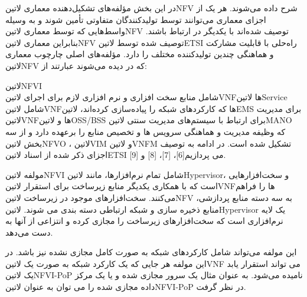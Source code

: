 
در این بخش مؤلفه‌های تشکیل‌دهنده معماری ‌لاتین{NFV} شرح داده می‌شوند.
هر یک از اجزای معماری می‌توانند توسط تولیدکنندگان متفاوتی تأمین شوند و به وسیله واسط‌هایی که توسط معماری ‌لاتین{NFV} توصیف شده‌اند
با یکدیگر در ارتباط باشند.
بنابراین معماری ‌لاتین{NFV} توصیف شده توسط ‌لاتین{ETSI} راه‌حلی با قابلیت مشارکت و هماهنگی چندین تولیدکننده مختلف را دارد.
مؤلفه‌های اصلی چارچوب معماری ‌لاتین{NFV} که در  دیده می‌شوند عبارتند از:

 ‌لاتین{NFVI}\\ شامل منابع سخت افزاری و نرم افزاری لازم برای اجرای ‌لاتین{VNF}ها
 ‌لاتین{Service}\\ شامل ‌لاتین{VNF}ها که کارکردهای شبکه را پیاده‌سازی کرده‌اند، ‌لاتین{EMS} برای مدیریت ‌لاتین{VNF}ها و ‌لاتین{OSS/BSS} برای ارتباط با سیستم‌های مدیریت سنتی
 ‌لاتین{MANO}\\ که وظیفه مدیریت و هماهنگی سرویس ها و تخصیص منابع را برعهده دارد و از سه بخش
‌لاتین{NFVO}
، ‌لاتین{VIM}
و ‌لاتین{VNFM}
تشکیل شده است.
در ادامه به توصیف اجزای ذکر شده از اسناد ‌لاتین{ETSI} می پردازیم[6]، [7]، [8] و [9].

مولفه ‌لاتین{NFVI} شامل تمام نرم‌افزارها، مانند ‌لاتین{Hypervisor}، و سخت‌افزارهایی است که با همکاری یکدیگر منابع زیرساخت برای استقرار ‌لاتین{VNF}ها را فراهم می‌کنند.
سخت‌افزارهای موجود در زیرساخت ‌لاتین{NFV} به سه دسته منابع پردازشی، منابع ذخیره سازی و شبکه ارتباطی دسته بندی می شوند.
‌لاتین{Hypervisor} یک لایه نرم‌افزاری است که سخت‌افزارهای زیرساخت را مجازی کرده و انتزاعی از آن‍ها به دست می‌دهد.

این مولفه می‌تواند شامل کارکردهای شبکه به صورت کامل مجازی نشده نیز باشد.
در این مولفه هر جایی که یک کارکرد شبکه به صورت یک ‌لاتین{VNF} می تواند استقرار یابد یک ‌لاتین{NFVI-PoP} نامیده می‌شود.
به عنوان مثال یک سرور مجازی شده و یا یک مرکز داده مجازی شده را می توان به عنوان ‌لاتین{NFVI-PoP} در نظر گرفت.


